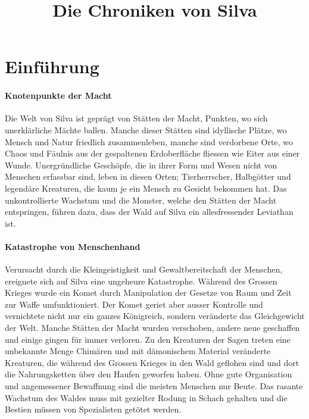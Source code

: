 \documentclass[10pt,twoside,twocolumn,openany]{book}
\title{Die Chroniken von Silva}
\begin{document}
\maketitle
\tableofcontents

\chapter{Einführung}
\subsubsection{Knotenpunkte der Macht} Die Welt von Silva ist geprägt von Stätten der Macht, Punkten, wo sich unerklärliche Mächte ballen. Manche dieser Stätten sind idyllische Plätze, wo Mensch und Natur friedlich zusammenleben, manche sind verdorbene Orte, wo Chaos und Fäulnis aus der gespaltenen Erdoberfläche fliessen wie Eiter aus einer Wunde. Unergründliche Geschöpfe, die in ihrer Form und Wesen nicht von Menschen erfassbar sind, leben in diesen Orten; Tierherrscher, Halbgötter und legendäre Kreaturen, die kaum je ein Mensch zu Gesicht bekommen hat. Das unkontrollierte Wachstum und die Monster, welche den Stätten der Macht entspringen, führen dazu, dass der Wald auf Silva ein allesfressender Leviathan ist.
	
\subsubsection{Katastrophe von Menschenhand} Verursacht durch die Kleingeistigkeit und Gewaltbereitschaft der Menschen, ereignete sich auf Silva eine ungeheure Katastrophe. Während des Grossen Krieges wurde ein Komet durch Manipulation der Gesetze von Raum und Zeit zur Waffe umfunktioniert. Der Komet geriet aber ausser Kontrolle und vernichtete nicht nur ein ganzes Königreich, sondern veränderte das Gleichgewicht der Welt. Manche Stätten der Macht wurden verschoben, andere neue geschaffen und einige gingen für immer verloren. Zu den Kreaturen der Sagen treten eine unbekannte Menge Chimären und mit dämonischem Material veränderte Kreaturen, die während des Grossen Krieges in den Wald geflohen sind und dort die Nahrungsketten über den Haufen geworfen haben. Ohne gute Organisation und angemessener Bewaffnung sind die meisten Menschen nur Beute. Das rasante Wachstum des Waldes muss mit gezielter Rodung in Schach gehalten und die Bestien müssen von Spezialisten getötet werden.

\end{document}
